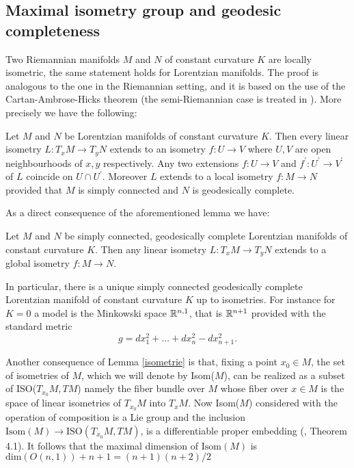 \subsection{Maximal isometry group and geodesic completeness} Two Riemannian manifolds $M$ and $N$ of constant curvature $K$ are locally isometric, the same statement holds for Lorentzian manifolds. The proof is analogous to the one in the Riemannian setting, and it is based on the use of the Cartan-Ambrose-Hicks theorem (the semi-Riemannian case is treated in \cite{piccione2005single}). More precisely we have the following:

\begin{lemma}\label{isometrie} Let $M$ and $N$ be Lorentzian manifolds of constant curvature $K$. Then every linear isometry $L:T_{x}M\to T_yN$ extends to an isometry $f:U\to V$ where $U, V$ are open neighbourhoods of $x, y$ respectively. Any two extensions $f:U\to V$ and $f^{\prime}:U^{\prime} \to V^{\prime} $ of $L$ coincide on $U\cap U^{\prime}. $ Moreover $L$ extends to a local isometry $f:M\to N$ provided that $M$ is simply connected and $N$ is geodesically complete. 
\end{lemma}

As a direct consequence of the aforementioned lemma we have: 
\begin{corollary}\label{122}
    Let $M$ and $N$ be simply connected, geodesically complete Lorentzian manifolds of constant curvature $K$. Then any linear isometry $L:T_xM\to T_yN$ extends to a global isometry $f:M\to N.$   
\end{corollary}

In particular, there is a unique simply connected geodesically complete Lorentzian manifold of constant curvature $K$ up to isometries. For instance for $K=0$ a model is the Minkowski space $\mathbb{R}^{n,1}$, that is $\mathbb{R}^{n+1}$ provided with the standard metric
\[
    g=dx_1^{2}+\dots+dx_n^{2}-dx_{n+1}^2.   
\]

Another consequence of Lemma \ref{isometrie} is that, fixing a point $x_0 \in M$, the set of isometries of $M$, which we will denote by Isom($M$), can be realized as a subset of ISO($T_{x_0}M, TM$) namely the fiber bundle over $M$ whose fiber over $x\in M$ is the space of linear isometries of $T_{x_0}M$ into $T_{x}M$. Now Isom($M$) considered with the operation of composition is a Lie group and the inclusion $\text{Isom}(M)\to \text{ISO}(T_{x_0}M, TM)$, is a differentiable proper embedding (\cite{okubo_1970}, Theorem 4.1). It follows that the maximal dimension of $\text{Isom}(M)$ is $\text{dim}(O(n,1))+n+1=(n+1)(n+2)/2$

